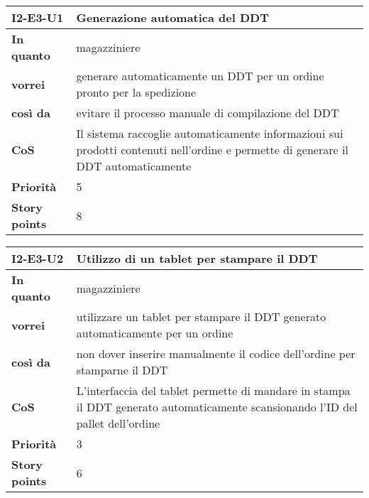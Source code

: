 \begin{table}[H]
  \begin{tabularx}{\textwidth}{lX}
    \toprule
    \textbf{I2-E3-U1} & \textbf{Generazione automatica del DDT} \\
    \midrule
    \textbf{In quanto} & magazziniere \\
    \textbf{vorrei} & generare automaticamente un DDT per un ordine pronto per la spedizione \\
    \textbf{così da} & evitare il processo manuale di compilazione del DDT \\
    \midrule
    \textbf{CoS} & Il sistema raccoglie automaticamente informazioni sui prodotti contenuti nell'ordine e permette di generare il DDT automaticamente \\
    \midrule
    \textbf{Priorità} & 5 \\
    \textbf{Story points} & 8 \\
    \bottomrule
  \end{tabularx}
  \label{user-story:i2-e3-u1}
\end{table}

\begin{table}[H]
  \begin{tabularx}{\textwidth}{lX}
    \toprule
    \textbf{I2-E3-U2} & \textbf{Utilizzo di un tablet per stampare il DDT} \\
    \midrule
    \textbf{In quanto} & magazziniere \\
    \textbf{vorrei} & utilizzare un tablet per stampare il DDT generato automaticamente per un ordine \\
    \textbf{così da} & non dover inserire manualmente il codice dell'ordine per stamparne il DDT \\
    \midrule
    \textbf{CoS} & L'interfaccia del tablet permette di mandare in stampa il DDT generato automaticamente scansionando l'ID del pallet dell'ordine \\
    \midrule
    \textbf{Priorità} & 3 \\
    \textbf{Story points} & 6 \\
    \bottomrule
  \end{tabularx}
  \label{user-story:i2-e3-u2}
\end{table}


